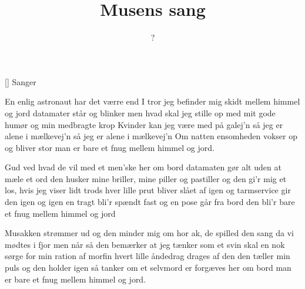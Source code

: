 \documentclass[a4paper,11pt]{article}
\title{Musens sang}
\author{?}
\begin{document}
\maketitle

\begin{roles}
[] Sanger
\end{roles}

\begin{song}
En enlig astronaut har det værre end I tror
jeg befinder mig skidt mellem himmel og jord
datamater står og blinker men hvad skal jeg stille op
med mit gode humør og min medbragte krop
Kvinder kan jeg være med på galej'n
så jeg er alene i mælkevej'n
så jeg er alene i mælkevej'n
Om natten ensomheden vokser op og bliver stor
man er bare et fnug mellem himmel og jord.

Gud ved hvad de vil med et men'ske her om bord
datamaten gør alt uden at mæle et ord
den husker mine briller, mine piller og pastiller
og den gi'r mig et los, hvis jeg viser lidt trods
hver lille prut bliver slået af igen
og tarmservice gir den igen og igen
en tragt bli'r spændt fast og en pose går fra bord
den bli'r bare et fnug mellem himmel og jord

Musakken strømmer ud og den minder mig om hor
ak, de spilled den sang da vi mødtes i fjor
men når så den bemærker at jeg tænker som et svin
skal en nok sørge for min ration af morfin
hvert lille åndedrag drages af den
den tæller min puls og den holder igen
så tanker om et selvmord er forgæves her om bord
man er bare et fnug mellem himmel og jord.
\end{song}
\end{document}
